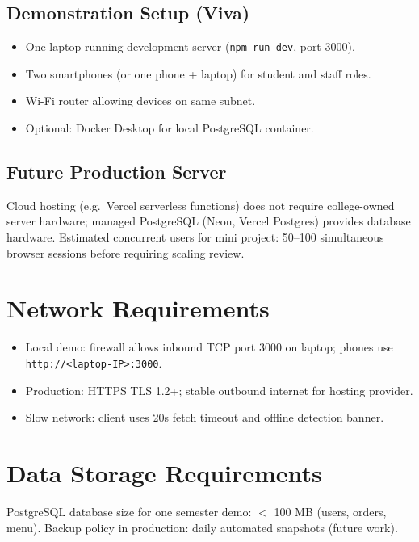 \subsection{Demonstration Setup (Viva)}
\begin{itemize}
  \item One laptop running development server (\texttt{npm run dev}, port 3000).
  \item Two smartphones (or one phone + laptop) for student and staff roles.
  \item Wi-Fi router allowing devices on same subnet.
  \item Optional: Docker Desktop for local PostgreSQL container.
\end{itemize}

\subsection{Future Production Server}
Cloud hosting (e.g.\ Vercel serverless functions) does not require college-owned server hardware; managed PostgreSQL (Neon, Vercel Postgres) provides database hardware. Estimated concurrent users for mini project: 50--100 simultaneous browser sessions before requiring scaling review.

\section{Network Requirements}
\begin{itemize}
  \item Local demo: firewall allows inbound TCP port 3000 on laptop; phones use \texttt{http://<laptop-IP>:3000}.
  \item Production: HTTPS TLS 1.2+; stable outbound internet for hosting provider.
  \item Slow network: client uses 20s fetch timeout and offline detection banner.
\end{itemize}

\section{Data Storage Requirements}
PostgreSQL database size for one semester demo: $<$ 100 MB (users, orders, menu). Backup policy in production: daily automated snapshots (future work).
